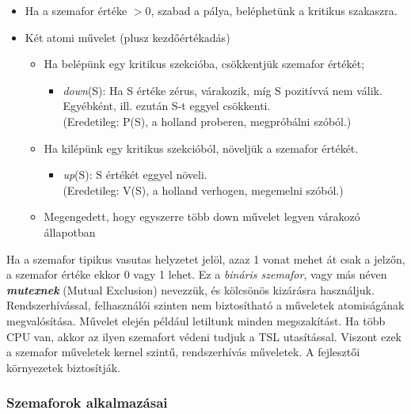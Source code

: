 \documentclass[tikz,12pt,margin=0px]{article}
\begin{document}
    \begin{itemize}[topsep=8pt,itemsep=4pt,partopsep=4pt, parsep=4pt]
        \item Ha a szemafor értéke $> 0$, szabad a pálya, beléphetünk a kritikus szakaszra.
        \item Két atomi művelet (plusz kezdőértékadás)
        \begin{itemize}
            \item Ha belépünk egy kritikus szekcióba, csökkentjük szemafor értékét;
            \begin{itemize}
                \item \emph{down}(S): Ha S értéke zérus, várakozik, míg S pozitívvá nem válik. Egyébként, ill. ezután S-t eggyel csökkenti.\\
                (Eredetileg: P(S), a holland proberen, megpróbálni szóból.)
            \end{itemize}
            \item Ha kilépünk egy kritikus szekcióból, növeljük a szemafor értékét.
            \begin{itemize}
                \item \emph{up}(S): S értékét eggyel növeli. \\
                (Eredetileg: V(S), a holland verhogen, megemelni szóból.)
            \end{itemize}
            \item Megengedett, hogy egyszerre több down művelet legyen várakozó állapotban
        \end{itemize}
    \end{itemize}

    \noindent Ha a szemafor tipikus vasutas helyzetet jelöl, azaz 1 vonat mehet át csak a jelzőn, a szemafor értéke ekkor 0 vagy 1 lehet. Ez a \textit{bináris szemafor}, vagy más néven \textbf{\emph{mutexnek}} (Mutual Exclusion) nevezzük, és kölcsönös kizárásra használjuk. \\

    \noindent Rendszerhívással, felhasználói szinten nem biztosítható a műveletek atomiságának megvalósítása. Művelet elején például letiltunk minden megszakítást. Ha több CPU van, akkor az ilyen szemafort védeni tudjuk a TSL utasítással. Viszont ezek a szemafor műveletek kernel szintű, rendszerhívás műveletek. A fejlesztői környezetek biztosítják.

    \subsubsection*{Szemaforok alkalmazásai}
\end{document}
